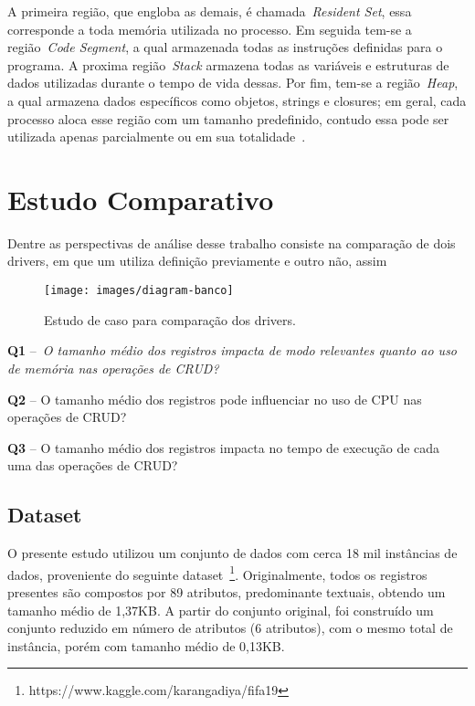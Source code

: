 \documentclass[12pt]{article}
\begin{document}
A primeira região, que engloba as demais, é chamada~\emph{Resident Set}, essa corresponde a toda memória utilizada no processo. 
Em seguida tem-se a região~\emph{Code Segment}, a qual armazenada todas as instruções definidas para o programa.
A proxima região~\emph{Stack} armazena todas as variáveis e estruturas de dados utilizadas durante o tempo de vida dessas.
Por fim, tem-se a região~\emph{Heap}, a qual armazena dados específicos como objetos, strings e closures; em geral, cada processo aloca esse região com um tamanho predefinido, contudo essa pode ser utilizada apenas parcialmente ou em sua totalidade~\cite{nodememory}. 

\section{Estudo Comparativo}
\label{section:estudo}

Dentre as perspectivas de análise desse trabalho consiste na comparação de dois drivers, em que um utiliza definição previamente e outro não, assim

\begin{figure}[h]
    \centering
    \texttt{[image: images/diagram-banco]}
    \label{fig:diagrama-banco}
    \caption{Estudo de caso para comparação dos drivers.}
\end{figure}


\textbf{Q1} --~\emph{O tamanho médio dos registros impacta de modo relevantes quanto ao uso de memória nas operações de CRUD?}

\textbf{Q2} -- O tamanho médio dos registros pode influenciar no uso de CPU nas operações de CRUD? 

\textbf{Q3} -- O tamanho médio dos registros impacta no tempo de execução de cada uma das operações de CRUD?


\subsection{Dataset}

O presente estudo utilizou um conjunto de dados com cerca 18 mil instâncias de dados, proveniente do seguinte dataset~\footnote{https://www.kaggle.com/karangadiya/fifa19}.
Originalmente, todos os registros presentes são compostos por 89 atributos, predominante textuais, obtendo um tamanho médio de 1,37KB.
A partir do conjunto original, foi construído um conjunto reduzido em número de atributos (6 atributos), com o mesmo total de instância, porém com tamanho médio de 0,13KB.
\end{document}
